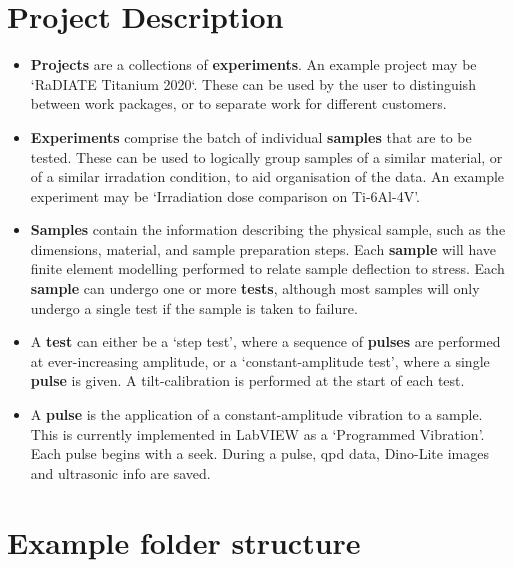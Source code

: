 \documentclass{article}
\begin{document}
\section*{Project Description}

\begin{itemize}
  \item{
    \textbf{Projects} are a collections of \textbf{experiments}.
    An example project may be `RaDIATE Titanium 2020`.
    These can be used by the user to distinguish between work packages, or to separate work for different customers.
  }
  \item{
    \textbf{Experiments} comprise the batch of individual \textbf{samples} that are to be tested.
    These can be used to logically group samples of a similar material, or of a similar irradation condition, to aid organisation of the data.
    An example experiment may be `Irradiation dose comparison on Ti-6Al-4V'.
  }
  \item{
    \textbf{Samples} contain the information describing the physical sample, such as the dimensions, material, and sample preparation steps.
    Each \textbf{sample} will have finite element modelling performed to relate sample deflection to stress.
    Each \textbf{sample} can undergo one or more \textbf{tests}, although most samples will only undergo a single test if the sample is taken to failure.
  }
  \item{
    A \textbf{test} can either be a `step test', where a sequence of \textbf{pulses} are performed at ever-increasing amplitude, or a `constant-amplitude test', where a single \textbf{pulse} is given.
    A tilt-calibration is performed at the start of each test.
  }
  \item{
    A \textbf{pulse} is the application of a constant-amplitude vibration to a sample.
    This is currently implemented in LabVIEW as a `Programmed Vibration'.
    Each pulse begins with a seek.
    During a pulse, qpd data, Dino-Lite images and ultrasonic info are saved. 
  }  
\end{itemize}

\section*{Example folder structure}

\end{document}
